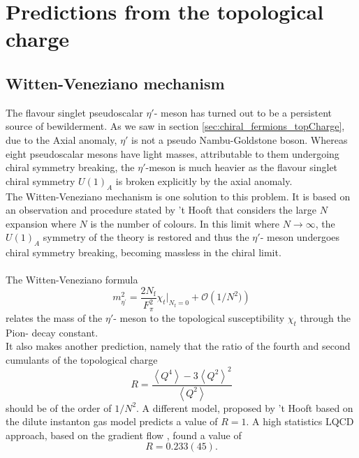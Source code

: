 \documentclass[a4paper,10pt]{book}
\begin{document}
\section{Predictions from the topological charge}
\subsection{Witten-Veneziano mechanism}
The flavour singlet pseudoscalar $\eta '$- meson has turned out to be a persistent source of bewilderment. As we saw in section \ref{sec:chiral_fermions_topCharge}, due to the Axial anomaly, $\eta '$ is not a pseudo Nambu-Goldstone boson. Whereas eight pseudoscalar mesons have light masses, attributable to them undergoing chiral symmetry breaking, the $\eta '$-meson is much heavier as the flavour singlet chiral symmetry $U(1)_A$ is broken explicitly by the axial anomaly.\\
The Witten-Veneziano mechanism\cite{VenezianoG1979Uwi}\cite{WittenE1979Catf} is one solution to this problem. It is based on an observation and procedure stated by 't Hooft \cite{HOOFT1974461} that considers the large $N$ expansion where $N$ is the number of colours. In this limit where $N\rightarrow \infty$, the $U(1)_A$ symmetry of the theory is restored and thus the $\eta '$- meson undergoes chiral symmetry breaking, becoming massless in the chiral limit.\\\\ The Witten-Veneziano formula
\begin{equation}\label{eq:etaPrimeMass}
m_{\eta^{\prime}}^{2}=\frac{2 N_{\mathrm{f}}}{F_{\pi}^{2}} \chi_{t}\big|_{N_{\mathrm{f}}=0} + \mathcal{O}\left( 1/N^2) \right)
\end{equation}
relates the mass of the $\eta '$- meson to the topological susceptibility $\chi_{t}$ through the Pion- decay constant.\\It also makes another prediction, namely that the ratio of the fourth and second cumulants of the topological charge
\begin{equation}
R=\frac{\left\langle Q^{4}\right\rangle-3\left\langle Q^{2}\right\rangle^{2}}{\left\langle Q^{2}\right\rangle}
\end{equation}
should be of the order of $1/N^2$. A different model, proposed by 't Hooft based on the dilute instanton gas model predicts a value of $R=1$. A high statistics LQCD approach, based on the gradient flow \cite{non_gaussianities2015}, found a value of 
\begin{equation}
R = 0.233(45).
\end{equation}
\end{document}
